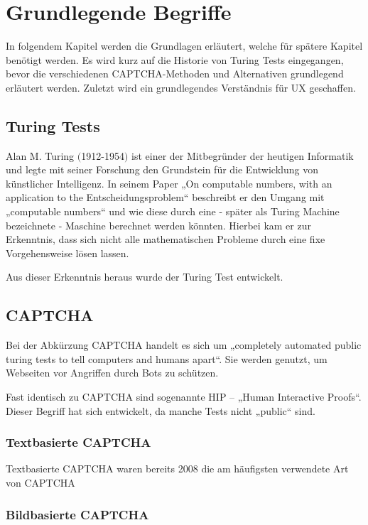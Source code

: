 \chapter{Grundlegende Begriffe}
\label{ch:basics}
In folgendem Kapitel werden die Grundlagen erläutert, welche für spätere Kapitel benötigt werden. 
Es wird kurz auf die Historie von Turing Tests eingegangen, 
bevor die verschiedenen CAPTCHA-Methoden und Alternativen grundlegend erläutert werden. 
Zuletzt wird ein grundlegendes Verständnis für UX geschaffen.

\section{Turing Tests}
\label{ch:basics:turing}
Alan M. Turing $($1912-1954$)$ ist einer der Mitbegründer der heutigen Informatik 
und legte mit seiner Forschung den Grundstein für die Entwicklung von künstlicher Intelligenz. 
In seinem Paper „On computable numbers, with an application to the Entscheidungsproblem“ \cite{turing} 
beschreibt er den Umgang mit „computable numbers“ und wie diese durch eine - später als Turing Machine bezeichnete - Maschine berechnet werden könnten. 
Hierbei kam er zur Erkenntnis, dass sich nicht alle mathematischen Probleme durch eine fixe Vorgehensweise lösen lassen. \cite[p.647]{geniusofturing} 

Aus dieser Erkenntnis heraus wurde der Turing Test entwickelt. 

\section{CAPTCHA}
Bei der Abkürzung CAPTCHA handelt es sich um „completely automated public turing tests to tell computers and humans apart“. 
Sie werden genutzt, um Webseiten vor Angriffen durch Bots zu schützen. 

Fast identisch zu CAPTCHA sind sogenannte HIP – „Human Interactive Proofs“. 
Dieser Begriff hat sich entwickelt, da manche Tests nicht „public“ sind. \cite[p.1]{chellapilla} \cite{tutorial} 


\subsection{Textbasierte CAPTCHA}

Textbasierte CAPTCHA waren bereits 2008 die am häufigsten verwendete Art von CAPTCHA 


\subsection{Bildbasierte CAPTCHA}
